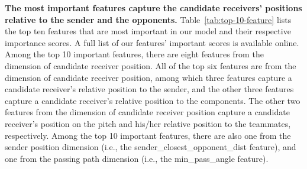 \textbf{The most important features capture the candidate receivers' positions relative to the sender and the opponents.}
Table~\ref{tab:top-10-feature} lists the top ten features that are most important in our model and their respective importance scores.
A full list of our features' important scores is available online\footnotemark[\ref{feature-list}].
Among the top 10 important features, there are eight features from the dimension of candidate receiver position. %
All of the top six features are from the dimension of candidate receiver position, among which three features capture a candidate receiver's relative position to the sender, and the other three features capture a candidate receiver's relative position to the components.
The other two features from the dimension of candidate receiver position capture a candidate receiver's position on the pitch and his/her relative position to the teammates, respectively.
Among the top 10 important features, there are also one from the sender position dimension (i.e., the sender\_closest\_opponent\_dist feature), and one from the passing path dimension (i.e., the min\_pass\_angle feature).

